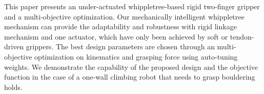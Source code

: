\documentclass[letterpaper, 10 pt, conference]{ieeeconf}  %
\begin{document}
  




This paper presents an under-actuated whippletree-based rigid two-finger gripper and a multi-objective optimization. %
Our mechanically intelligent whippletree mechanism can provide the adaptability and robustness with rigid linkage mechanism and one actuator, which have only been achieved by soft or tendon-driven grippers.
The best design parameters are chosen through an multi-objective optimization on kinematics and grasping force using auto-tuning weights.
We demonstrate the capability of the proposed design and the objective function in the case of a one-wall climbing robot that needs to grasp bouldering holds.




%    
\end{document}

